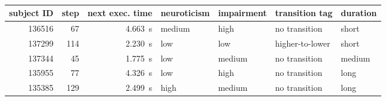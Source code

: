 \begin{table*}
    \centering
    \caption{}\label{tab:exectime:proc}
\begin{tabular}{rrrllll}
\toprule
subject ID &  step &  next exec. time & neuroticism &  impairment & transition tag & duration \\
\midrule
\num{136516} &   \num{67} & \SI{4.663}{\second} & medium & high & no transition & short \\
%
\num{137299} &  \num{114} & \SI{2.230}{\second} & low & low & higher-to-lower &  short \\
\num{137344} &   \num{45} & \SI{1.775}{\second} & low &  medium & no transition & medium \\
\num{135955} &   \num{77} & \SI{4.326}{\second} & low &  high & no transition & long \\
\num{135385} &  \num{129} & \SI{2.499}{\second} & high &  medium & no transition & long \\
\bottomrule
\end{tabular}
\end{table*}
    
